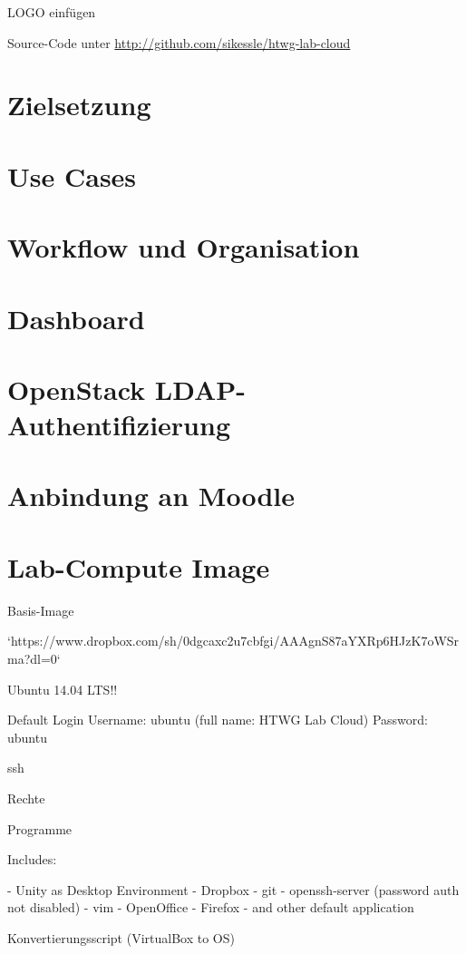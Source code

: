 LOGO einfügen

Source-Code unter \url{http://github.com/sikessle/htwg-lab-cloud}

\section{Zielsetzung}

\section{Use Cases}

\section{Workflow und Organisation}

\section{Dashboard}

\section{OpenStack LDAP-Authentifizierung}

\section{Anbindung an Moodle}

\section{Lab-Compute Image}

Basis-Image

`https://www.dropbox.com/sh/0dgcaxc2u7cbfgi/AAAgnS87aYXRp6HJzK7oWSrma?dl=0`

Ubuntu 14.04 LTS!!

Default Login
Username: ubuntu (full name: HTWG Lab Cloud)
Password: ubuntu

ssh

Rechte

Programme

Includes:

- Unity as Desktop Environment
- Dropbox
- git
- openssh-server (password auth not disabled)
- vim
- OpenOffice
- Firefox 
- and other default application

Konvertierungsscript (VirtualBox to OS)

